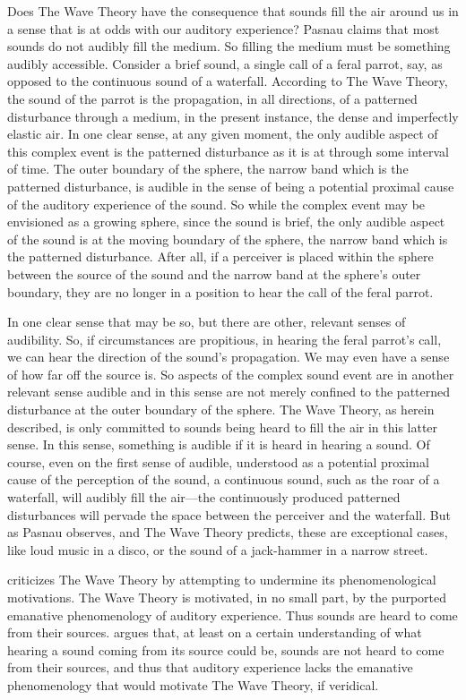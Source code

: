 Does The Wave Theory have the consequence that sounds fill the air around us in a sense that is at odds with our auditory experience? Pasnau claims that most sounds do not audibly fill the medium. So filling the medium must be something audibly accessible. Consider a brief sound, a single call of a feral parrot, say, as opposed to the continuous sound of a waterfall. According to The Wave Theory, the sound of the parrot is the propagation, in all directions, of a patterned disturbance through a medium, in the present instance, the dense and imperfectly elastic air. In one clear sense, at any given moment, the only audible aspect of this complex event is the patterned disturbance as it is at through some interval of time. The outer boundary of the sphere, the narrow band which is the patterned disturbance, is audible in the sense of being a potential proximal cause of the auditory experience of the sound. So while the complex event may be envisioned as a growing sphere, since the sound is brief, the only audible aspect of the sound is at the moving boundary of the sphere, the narrow band which is the patterned disturbance. After all, if a perceiver is placed within the sphere between the source of the sound and the narrow band at the sphere's outer boundary, they are no longer in a position to hear the call of the feral parrot. 

In one clear sense that may be so, but there are other, relevant senses of audibility. So, if circumstances are propitious, in hearing the feral parrot's call, we can hear the direction of the sound's propagation. We may even have a sense of how far off the source is. So aspects of the complex sound event are in another relevant sense audible and in this sense are not merely confined to the patterned disturbance at the outer boundary of the sphere. The Wave Theory, as herein described, is only committed to sounds being heard to fill the air in this latter sense. In this sense, something is audible if it is heard in hearing a sound. Of course, even on the first sense of audible, understood as a potential proximal cause of the perception of the sound, a continuous sound, such as the roar of a waterfall, will audibly fill the air---the continuously produced patterned disturbances will pervade the space between the perceiver and the waterfall. But as Pasnau observes, and The Wave Theory predicts, these are exceptional cases, like loud music in a disco, or the sound of a jack-hammer in a narrow street.

\citet[chapter 3.4]{OCallaghan:2007xy} criticizes The Wave Theory by attempting to undermine its phenomenological motivations. The Wave Theory is motivated, in no small part, by the purported emanative phenomenology of auditory experience. Thus sounds are heard to come from their sources. \citet{OCallaghan:2007xy,OCallaghan:2009aa} argues that, at least on a certain understanding of what hearing a sound coming from its source could be, sounds are not heard to come from their sources, and thus that auditory experience lacks the emanative phenomenology that would motivate The Wave Theory, if veridical.

